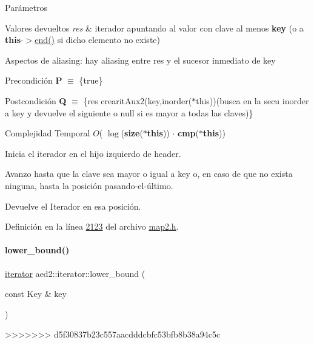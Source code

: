 \begin{DoxyParams}{\-Parámetros}
\begin{DoxyRetVals}{Valores devueltos}
{\em res} & iterador apuntando al valor con clave al menos {\bfseries key} (o a {\bfseries this}-\/$>$\hyperlink{classaed2_1_1iterator_a67caf9468be999e9be96b7add5d79946_a67caf9468be999e9be96b7add5d79946}{end()} si dicho elemento no existe)\\
\hline
\end{DoxyRetVals}
\begin{DoxyParagraph}{Aspectos de aliasing\+:}
hay aliasing entre res y el sucesor inmediato de key
\end{DoxyParagraph}
\begin{DoxyPrecond}{Precondición}
{\bfseries P} $\equiv$ \{true\} 
\end{DoxyPrecond}
\begin{DoxyPostcond}{Postcondición}
{\bfseries Q} $\equiv$ \{res  crearit\+Aux2(key,inorder($\ast$this))(busca en la secu inorder a key y devuelve el siguiente o null si es mayor a todas las claves)\}
\end{DoxyPostcond}

\begin{DoxyDescription}
\item[Complejidad Temporal]$O$( $\log$({\bfseries size}({\bfseries $\ast$this})) $\cdot$ {\bfseries cmp}({\bfseries $\ast$this}))
\end{DoxyDescription}
\begin{DoxyItemize}
\item Inicia el iterador en el hijo izquierdo de header.
\item Avanzo hasta que la clave sea mayor o igual a key o, en caso de que no exista ninguna, hasta la posición pasando-\/el-\/último.
\item Devuelve el Iterador en esa posición. 
\end{DoxyItemize}

Definición en la línea \hyperlink{map2_8h_source_l02123}{2123} del archivo \hyperlink{map2_8h_source}{map2.\+h}.

\mbox{\label{classaed2_1_1iterator_ac48bbb54fea69c1fb4c093eecda02c5a_ac48bbb54fea69c1fb4c093eecda02c5a}} 
\paragraph{\texorpdfstring{lower\+\_\+bound()}{lower\_bound()}\hspace{0.1cm}{\footnotesize\ttfamily [2/2]}}
{\footnotesize\ttfamily \hyperlink{classaed2_1_1iterator_1_1iterator}{iterator} aed2\+::iterator\+::lower\+\_\+bound (\begin{DoxyParamCaption}\item[{const Key \&}]{key }\end{DoxyParamCaption})\hspace{0.3cm}{\ttfamily [inline]}}
>>>>>>> d5f30837b23c557aacdddcbfc53bfb8b38a94c5c


\end{DoxyParams}

